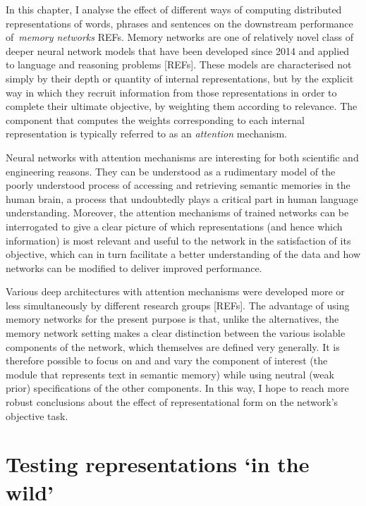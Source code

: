 \label{CH6}

In this chapter, I analyse the effect of different ways of computing distributed representations of words, phrases and sentences on the downstream performance of~\emph{memory networks} REFs. Memory networks are one of relatively novel class of deeper neural network models that have been developed since 2014 and applied to language and reasoning problems [REFs]. These models are characterised not simply by their depth or quantity of internal representations, but by the explicit way in which they recruit information from those representations in order to complete their ultimate objective, by weighting them according to relevance. The component that computes the weights corresponding to each internal representation is typically referred to as an \emph{attention} mechanism. 

Neural networks with attention mechanisms are interesting for both scientific and engineering reasons. They can be understood as a rudimentary model of the poorly understood process of accessing and retrieving semantic memories in the human brain, a process that undoubtedly plays a critical part in human language understanding. Moreover, the attention mechanisms of trained networks can be interrogated to give a clear picture of which representations (and hence which information) is most relevant and useful to the network in the satisfaction of its objective, which can in turn facilitate a better understanding of the data and how networks can be modified to deliver improved performance.  

Various deep architectures with attention mechanisms were developed more or less simultaneously by different research groups [REFs]. The advantage of using memory networks for the present purpose is that, unlike the alternatives, the memory network setting makes a clear distinction between the various isolable components of the network, which themselves are defined very generally. It is therefore possible to focus on and and vary the component of interest (the module that represents text in semantic memory) while using neutral (weak prior) specifications of the other components. In this way, I hope to reach more robust conclusions about the effect of representational form on the network's objective task.  


\section{Testing representations `in the wild'}

